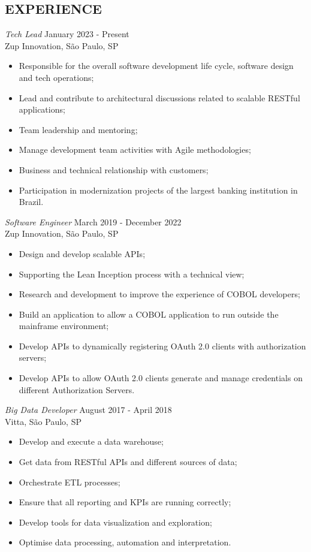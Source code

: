 \documentclass[margin, 10pt]{res} %
\begin{document}
\begin{resume}
\section{EXPERIENCE}

{\sl Tech Lead} \hfill January 2023 - Present \\
Zup Innovation, São Paulo, SP
\begin{itemize} \itemsep -2pt %
\item Responsible for the overall software development life cycle, software design and tech operations;
\item Lead and contribute to architectural discussions related to scalable RESTful applications;
\item Team leadership and mentoring;
\item Manage development team activities with Agile methodologies;
\item Business and technical relationship with customers;
\item Participation in modernization projects of the largest banking institution in Brazil.
\end{itemize}

{\sl Software Engineer} \hfill March 2019 - December 2022 \\
Zup Innovation, São Paulo, SP
\begin{itemize} \itemsep -2pt %
\item Design and develop scalable APIs;
\item Supporting the Lean Inception process with a technical view;
\item Research and development to improve the experience of COBOL developers;
\item Build an application to allow a COBOL application to run outside the mainframe environment;
\item Develop APIs to dynamically registering OAuth 2.0 clients with authorization servers;
\item Develop APIs to allow OAuth 2.0 clients generate and manage credentials on different Authorization Servers.
\end{itemize}

{\sl Big Data Developer} \hfill August 2017 - April 2018 \\
Vitta, São Paulo, SP
\begin{itemize} \itemsep -2pt %
\item Develop and execute a data warehouse;
\item Get data from RESTful APIs and different sources of data;
\item Orchestrate ETL processes;
\item Ensure that all reporting and KPIs are running correctly;
\item Develop tools for data visualization and exploration;
\item Optimise data processing, automation and interpretation.
\end{itemize}


\end{resume}
\end{document}
